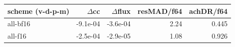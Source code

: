 \begin{tabular}{lrrrr}
\toprule
scheme (v-d-p-m) & $\Delta$cc & $\Delta$flux & resMAD/f64 & achDR/f64 \\
\midrule
all-bf16 & -9.1e-04 & -3.6e-04 & 2.24 & 0.445 \\
all-f16 & -2.5e-04 & -2.9e-05 & 1.08 & 0.926 \\
\bottomrule
\end{tabular}